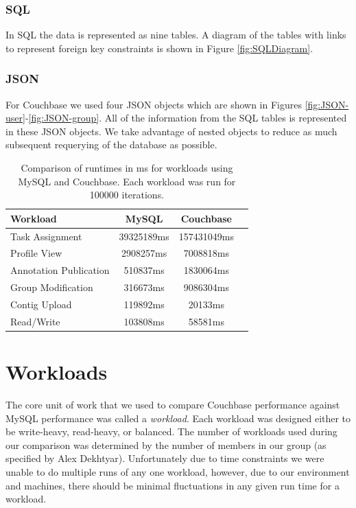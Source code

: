 \documentclass[10pt, conference, compsocconf]{IEEEtran}
\begin{document}
\subsubsection{SQL}
In SQL the data is represented as nine tables. A diagram of the tables with
links to represent foreign key constraints is shown in Figure \ref{fig:SQLDiagram}.

\subsubsection{JSON}
For Couchbase we used four JSON objects which are shown in Figures \ref{fig:JSON-user}-\ref{fig:JSON-group}.
All of the information from the SQL tables is represented in these JSON
objects. We take advantage of nested objects to reduce as much subsequent
requerying of the database as possible.

\begin{table}[t]
   \centering
      \begin{tabular}{| l | c | c | c |}
         \hline
            {\textbf{Workload}} &
            {\textbf{MySQL}} &
            {\textbf{Couchbase}} \\
         \hline
            Task Assignment         & 39325189ms & 157431049ms \\
         \hline
            Profile View            & 2908257ms & 7008818ms \\
         \hline
            Annotation Publication  & 510837ms & 1830064ms \\
         \hline
            Group Modification      & 316673ms & 9086304ms \\
         \hline
            Contig Upload           & 119892ms & 20133ms \\
         \hline
            Read/Write              & 103808ms & 58581ms \\
         \hline
      \end{tabular}
      \caption{Comparison of runtimes in ms for workloads using MySQL and Couchbase.
               Each workload was run for 100000 iterations.}
      \label{tab:workload_perf}
\end{table}

\section{Workloads}\label{sec:workload}
The core unit of work that we used to compare Couchbase performance against
MySQL performance was called a \textit{workload}. Each workload was designed
either to be write-heavy, read-heavy, or balanced. The number of workloads used
during our comparison was determined by the number of members in our group (as
specified by Alex Dekhtyar). Unfortunately due to time constraints we were
unable to do multiple runs of any one workload, however, due to our environment
and machines, there should be minimal fluctuations in any given run time for a
workload.
\end{document}
